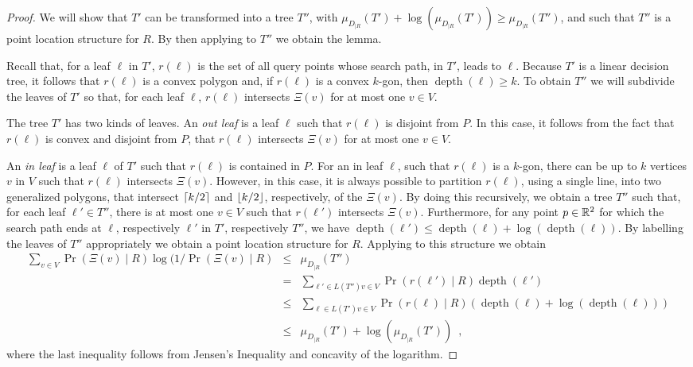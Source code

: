 \documentclass[charterfonts,lotsofwhite]{patmorin}
\DeclareMathOperator{\depth}{depth}
\begin{document}
\begin{proof}
We will show that $T'$ can be transformed into a tree $T''$, with
$\mu_{D_{|R}}(T') + \log\left(\mu_{D_{|R}}(T')\right) \ge
\mu_{D_{|R}}(T'')$, and such that $T''$ is a point location structure
for $R$. By then applying  to $T''$ we obtain the
lemma.

Recall that, for a leaf $\ell$ in $T'$, $r(\ell)$ is the set of all query
points whose search path, in $T'$, leads to $\ell$.  Because $T'$ is a
linear decision tree, it follows that $r(\ell)$ is a
convex polygon and, if $r(\ell)$ is
a convex $k$-gon, then $\depth(\ell) \ge k$.  To obtain $T''$ we will
subdivide the leaves of $T'$ so that, for each leaf $\ell$, $r(\ell)$
intersects $\Xi(v)$ for at most one $v\in V$.

The tree $T'$ has two kinds of leaves.  An \emph{out leaf} is a leaf
$\ell$ such that $r(\ell)$ is disjoint from $P$.  In this case, it
follows from the fact that $r(\ell)$ is convex and disjoint from $P$,
that $r(\ell)$ intersects $\Xi(v)$ for at most one $v\in V$.

An \emph{in leaf} is a leaf $\ell$ of $T'$ such that $r(\ell)$ is
contained in $P$.  For an in leaf $\ell$, such that $r(\ell)$ is a
$k$-gon, there can be up to $k$ vertices $v$ in $V$ such
that $r(\ell)$ intersects $\Xi(v)$. However, in this case, it is
always possible to partition $r(\ell)$, using a single line, into two generalized polygons,
that intersect $\left\lceil k/2 \right\rceil$ and $\left\lfloor k/2 \right\rfloor$, respectively, of the
$\Xi(v)$.  By doing this recursively, we obtain a tree $T''$ such
that, for each leaf $\ell'\in T''$, there is at most one $v\in V$ such
that $r(\ell')$ intersects $\Xi(v)$. Furthermore, for any point
$p\in\mathbb{R}^2$ for which the search path ends at $\ell$, respectively
$\ell'$ in $T'$, respectively $T''$, we have $\depth(\ell') \le
\depth(\ell) + \log(\depth(\ell))$.  By labelling the leaves of $T''$
appropriately we obtain a point location structure for $R$. Applying
 to this structure we obtain
\begin{eqnarray*}
\sum_{v\in V}\Pr(\Xi(v)\mid R)\log(1/\Pr(\Xi(v)\mid R)
 & \le & \mu_{D_{|R}}(T'')  \\
  & = & 
     \sum_{\ell'\in L(T'') v\in V}\Pr(r(\ell')\mid R)\depth(\ell') \\
  & \le & 
     \sum_{\ell\in L(T') v\in V}
         \Pr(r(\ell)\mid R)
            \left(\depth(\ell)+\log(\depth(\ell))\right) \\
  & \le &
     \mu_{D_{|R}}(T') + \log\left(\mu_{D_{|R}}(T')\right) \enspace ,
\end{eqnarray*}
where the last inequality follows from Jensen's Inequality \cite{j06}
and concavity of the logarithm.
\end{proof}
\end{document}
